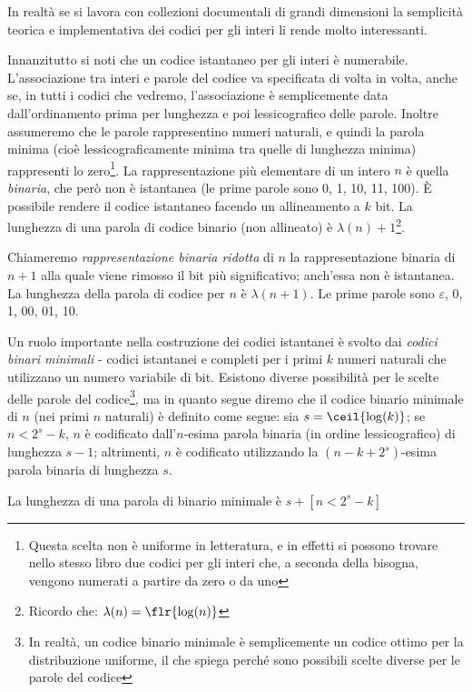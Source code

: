 In realtà se si lavora con collezioni documentali di grandi dimensioni la semplicità teorica e implementativa dei codici per gli interi li rende molto interessanti.

Innanzitutto si noti che un codice istantaneo per gli interi è numerabile. L'associazione tra interi e parole del codice va specificata di volta in volta, anche se, in tutti i codici che vedremo, l'associazione è semplicemente data dall'ordinamento prima per lunghezza e poi lessicografico delle parole. Inoltre assumeremo che le parole rappresentino numeri naturali, e quindi la parola minima (cioè lessicograficamente minima tra quelle di lunghezza minima) rappresenti lo zero\footnote{Questa scelta non è uniforme in letteratura, e in effetti si possono trovare nello stesso libro due codici per gli interi che, a seconda della bisogna, vengono numerati a partire da zero o da uno}.
La rappresentazione più elementare di un intero $n$ è quella \textit{binaria}, che però non è istantanea (le prime parole sono 0, 1, 10, 11, 100). È possibile rendere il codice istantaneo facendo un allineamento a $k$ bit. La lunghezza di una parola di codice binario (non allineato) è $\lambda(n) + 1$\footnote{Ricordo che: $\lambda(n) = \flr{\log(n)}$}.

Chiameremo \textit{rappresentazione binaria ridotta} di $n$ la rappresentazione binaria di $n + 1$ alla quale viene rimosso il bit più significativo; anch'essa non è istantanea. La lunghezza della parola di codice per $n$ è $\lambda(n + 1)$. Le prime parole sono $\varepsilon$, 0, 1, 00, 01, 10.

Un ruolo importante nella costruzione dei codici istantanei è svolto dai \textit{codici binari minimali} - codici istantanei e completi per i primi $k$ numeri naturali che utilizzano un numero variabile di bit. Esistono diverse possibilità per le scelte delle parole del codice\footnote{In realtà, un codice binario minimale è semplicemente un codice ottimo per la distribuzione uniforme, il che spiega perché sono possibili scelte diverse per le parole del codice}, ma in quanto segue diremo che il codice binario minimale di $n$ (nei primi $n$ naturali) è definito come segue: sia $s = \ceil{\log(k)}$; se $n < 2^s -k$, $n$ è codificato dall'$n$-esima parola binaria (in ordine lessicografico) di lunghezza $s - 1$; altrimenti, $n$ è codificato utilizzando la $(n - k + 2^s)$-esima parola binaria di lunghezza $s$.

La lunghezza di una parola di binario minimale è $s + [n < 2^s - k]$

